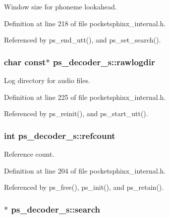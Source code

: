 Window size for phoneme lookahead. 



Definition at line 218 of file pocketsphinx\+\_\+internal.\+h.



Referenced by ps\+\_\+end\+\_\+utt(), and ps\+\_\+set\+\_\+search().

\subsubsection[{rawlogdir}]{\setlength{\rightskip}{0pt plus 5cm}char const$\ast$ ps\+\_\+decoder\+\_\+s\+::rawlogdir}\label{structps__decoder__s_aa2610c52a9267ee18ca095169bf34bfd}


Log directory for audio files. 



Definition at line 225 of file pocketsphinx\+\_\+internal.\+h.



Referenced by ps\+\_\+reinit(), and ps\+\_\+start\+\_\+utt().

\subsubsection[{refcount}]{\setlength{\rightskip}{0pt plus 5cm}int ps\+\_\+decoder\+\_\+s\+::refcount}\label{structps__decoder__s_aa5ab90180288b6c9039eb86b496f76aa}


Reference count. 



Definition at line 204 of file pocketsphinx\+\_\+internal.\+h.



Referenced by ps\+\_\+free(), ps\+\_\+init(), and ps\+\_\+retain().

\subsubsection[{search}]{$\ast$ ps\+\_\+decoder\+\_\+s\+::search}\label{structps__decoder__s_ad337270efc93613cf8dd7594f6515799}



